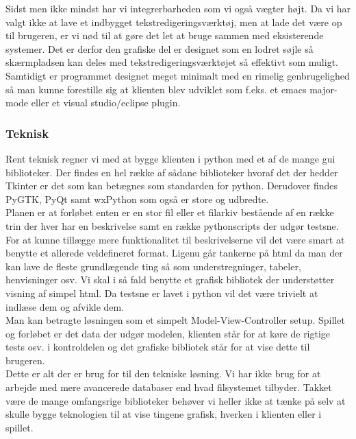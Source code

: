 \documentclass[10pt,a4paper,danish]{article}
\begin{document}
Sidst men ikke mindst har vi integrerbarheden som vi også vægter højt.
Da vi har valgt ikke at lave et indbygget tekstredigeringsværktøj, men at lade det være op til brugeren, er vi nød til at gøre det let at bruge sammen med eksisterende systemer. Det er derfor den grafiske del er designet som en lodret søjle så skærmpladsen kan deles med tekstredigeringsværktøjet så effektivt som muligt. Samtidigt er programmet designet meget minimalt med en rimelig genbrugelighed så man kunne forestille sig at klienten blev udviklet som f.eks. et emacs major-mode eller et visual studio/eclipse plugin.
\\

\paragraph{}

\subsubsection{Teknisk}
Rent teknisk regner vi med at bygge klienten i python med et af de mange gui biblioteker. Der findes en hel række af sådane biblioteker hvoraf det der hedder Tkinter er det som kan betægnes som standarden for python. Derudover findes PyGTK, PyQt samt wxPython som også er store og udbredte.
\\

Planen er at forløbet enten er en stor fil eller et filarkiv bestående af en række trin der hver har en beskrivelse samt en række pythonscripts der udgør testsne. For at kunne tillægge mere funktionalitet til beskrivelserne vil det være smart at benytte et allerede veldefineret format. Ligenu går tankerne på html da man der kan lave de fleste grundlægende ting så som understregninger, tabeler, henvisninger osv. Vi skal i så fald benytte et grafisk bibliotek der understøtter visning af simpel html.
Da testsne er lavet i python vil det være trivielt at indlæse dem og afvikle dem.
\\

Man kan betragte løsningen som et simpelt Model-View-Controller setup.
Spillet og forløbet er det data der udgør modelen, klienten står for at køre de rigtige tests osv. i kontroldelen og det grafiske bibliotek står for at vise dette til brugeren.
\\

Dette er alt der er brug for til den tekniske løsning. Vi har ikke brug for at arbejde med mere avancerede databaser end hvad filsystemet tilbyder. Takket være de mange omfangsrige biblioteker behøver vi heller ikke at tænke på selv at skulle bygge teknologien til at vise tingene grafisk, hverken i klienten eller i spillet.
\end{document}
